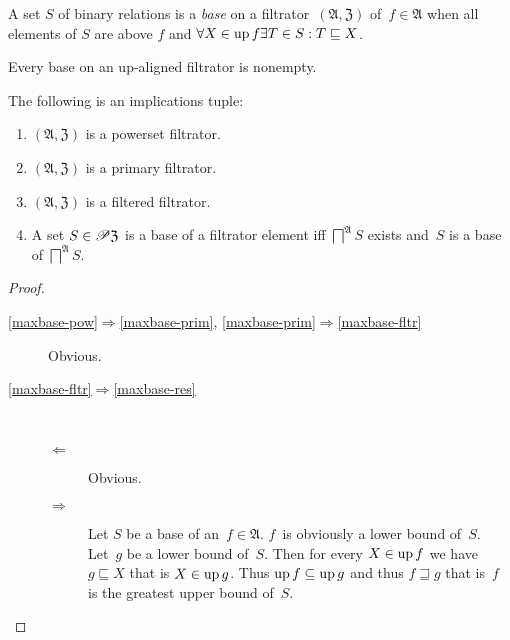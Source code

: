 \begin{defn}
  A set $S$ of binary relations is a \emph{base} on a filtrator~$(\mathfrak{A},\mathfrak{Z})$
  of~$f\in\mathfrak{A}$ when all elements
  of $S$ are above $f$ and $\forall X \in \operatorname{up} f \exists T \in S : T \sqsubseteq X$.
\end{defn}

\begin{obvious}
Every base on an up-aligned filtrator is nonempty.
\end{obvious}

\begin{prop}
The following is an implications tuple:
\begin{enumerate}
\item\label{maxbase-pow} $(\mathfrak{A},\mathfrak{Z})$ is a powerset filtrator.
\item\label{maxbase-prim} $(\mathfrak{A},\mathfrak{Z})$ is a primary filtrator.
\item\label{maxbase-fltr} $(\mathfrak{A},\mathfrak{Z})$ is a filtered filtrator.
\item\label{maxbase-res} A set $S\in\mathscr{P}\mathfrak{Z}$ is a base of a filtrator element iff
  $\bigsqcap^{\mathfrak{A}} S$ exists and~$S$ is a base of $\bigsqcap^{\mathfrak{A}} S$.
\end{enumerate}
\end{prop}

\begin{proof}
  ~
  \begin{description}
  \item[\ref{maxbase-pow}$\Rightarrow$\ref{maxbase-prim}, \ref{maxbase-prim}$\Rightarrow$\ref{maxbase-fltr}] Obvious.

  \item[\ref{maxbase-fltr}$\Rightarrow$\ref{maxbase-res}]
    ~
    \begin{description}
      \item[$\Leftarrow$] Obvious.

      \item[$\Rightarrow$] Let $S$ be a base of an~$f\in\mathfrak{A}$.
      $f$~is obviously a lower bound of~$S$. Let~$g$ be a lower bound of~$S$.
      Then for every $X\in\operatorname{up} f$ we have $g\sqsubseteq X$ that is $X\in\operatorname{up} g$.
      Thus $\operatorname{up} f\subseteq\operatorname{up} g$ and thus $f\sqsupseteq g$ that is~$f$ is the greatest upper bound of~$S$.
    \end{description}
  \end{description}
\end{proof}

